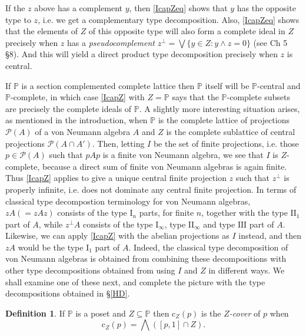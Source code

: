 \documentclass{amsart}
\theoremstyle{definition}
\newtheorem{dfn}[dfn]{Definition}
\numberwithin{equation}{section}
\begin{document}
If the $z$ above has a complement $y$, then \eqref{IcapZeq} shows that $y$ has the opposite type to $z$, i.e. we get a complementary type decomposition.  Also, \eqref{IcapZeq} shows that the elements of $Z$ of this opposite type will also form a complete ideal in $Z$ precisely when $z$ has a \emph{pseudocomplement} $z^\perp=\bigvee\{y\in Z:y\wedge z=0\}$ (see \cite{Birkhoff1967} Ch 5 \S8).  And this will yield a direct product type decomposition precisely when $z$ is central.

If $\mathbb{P}$ is a section complemented complete lattice then $\mathbb{P}$ itself will be $\mathbb{P}$-central and $\mathbb{P}$-complete, in which case \autoref{IcapZ} with $Z=\mathbb{P}$ says that the $\mathbb{P}$-complete subsets are precisely the complete ideals of $\mathbb{P}$.  A slightly more interesting situation arises, as mentioned in the introduction, when $\mathbb{P}$ is the complete lattice of projections $\mathcal{P}(A)$ of a von Neumann algebra $A$ and $Z$ is the complete sublattice of central projections $\mathcal{P}(A\cap A')$.  Then, letting $I$ be the set of finite projections, i.e. those $p\in\mathcal{P}(A)$ such that $pAp$ is a finite von Neumann algebra, we see that $I$ is $Z$-complete, because a direct sum of finite von Neumann algebras is again finite.  Thus \autoref{IcapZ} applies to give a unique central finite projection $z$ such that $z^\perp$ is properly infinite, i.e. does not dominate any central finite projection.  In terms of classical type decompostion terminology for von Neumann algebras, $zA(=zAz)$ consists of the type $\mathrm{I}_n$ parts, for finite $n$, together with the type $\mathrm{II}_1$ part of $A$, while $z^\perp A$ consists of the type $\mathrm{I}_\infty$, type $\mathrm{II}_\infty$ and type $\mathrm{III}$ part of $A$.  Likewise, we can apply \autoref{IcapZ} with the abelian projections as $I$ instead, and then $zA$ would be the type $\mathrm{I}_1$ part of $A$.  Indeed, the classical type decomposition of von Neumann algebras is obtained from combining these decompositions with other type decompositions obtained from using $I$ and $Z$ in different ways.  We shall examine one of these next, and complete the picture with the type decompositions obtained in \S\ref{HD}.









\begin{dfn}
If $\mathbb{P}$ is a poset and $Z\subseteq\mathbb{P}$ then $\mathrm{c}_Z(p)$ is the \emph{$Z$-cover} of $p$ when \[\mathrm{c}_Z(p)=\bigwedge([p,1]\cap Z).\]
\end{dfn}
\end{document}
